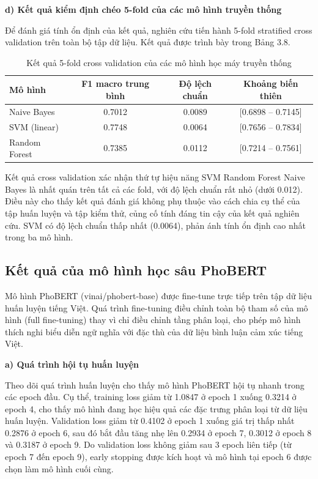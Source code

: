 \documentclass[14pt, a4paper]{report}
\begin{document}
\textbf{d) Kết quả kiểm định chéo 5-fold của các mô hình truyền thống}


Để đánh giá tính ổn định của kết quả, nghiên cứu tiến hành 5-fold stratified cross validation trên toàn bộ tập dữ liệu. Kết quả được trình bày trong Bảng 3.8.


\begin{table}[h]
\centering
\caption{Kết quả 5-fold cross validation của các mô hình học máy truyền thống}
\begin{tabular}{|l|c|c|c|}
\hline
\textbf{Mô hình} & \textbf{F1 macro trung bình} & \textbf{Độ lệch chuẩn} & \textbf{Khoảng biến thiên} \\
\hline
Naive Bayes & 0.7012 & 0.0089 & [0.6898 -- 0.7145] \\
\hline
SVM (linear) & 0.7748 & 0.0064 & [0.7656 -- 0.7834] \\
\hline
Random Forest & 0.7385 & 0.0112 & [0.7214 -- 0.7561] \\
\hline
\end{tabular}
\end{table}




Kết quả cross validation xác nhận thứ tự hiệu năng SVM \> Random Forest \> Naive Bayes là nhất quán trên tất cả các fold, với độ lệch chuẩn rất nhỏ (dưới 0.012). Điều này cho thấy kết quả đánh giá không phụ thuộc vào cách chia cụ thể của tập huấn luyện và tập kiểm thử, củng cố tính đáng tin cậy của kết quả nghiên cứu. SVM có độ lệch chuẩn thấp nhất (0.0064), phản ánh tính ổn định cao nhất trong ba mô hình.


\subsection{Kết quả của mô hình học sâu PhoBERT}


Mô hình PhoBERT (vinai/phobert-base) được fine-tune trực tiếp trên tập dữ liệu huấn luyện tiếng Việt. Quá trình fine-tuning điều chỉnh toàn bộ tham số của mô hình (full fine-tuning) thay vì chỉ điều chỉnh tầng phân loại, cho phép mô hình thích nghi biểu diễn ngữ nghĩa với đặc thù của dữ liệu bình luận cảm xúc tiếng Việt.


\textbf{a) Quá trình hội tụ huấn luyện}


Theo dõi quá trình huấn luyện cho thấy mô hình PhoBERT hội tụ nhanh trong các epoch đầu. Cụ thể, training loss giảm từ 1.0847 ở epoch 1 xuống 0.3214 ở epoch 4, cho thấy mô hình đang học hiệu quả các đặc trưng phân loại từ dữ liệu huấn luyện. Validation loss giảm từ 0.4102 ở epoch 1 xuống giá trị thấp nhất 0.2876 ở epoch 6, sau đó bắt đầu tăng nhẹ lên 0.2934 ở epoch 7, 0.3012 ở epoch 8 và 0.3187 ở epoch 9. Do validation loss không giảm sau 3 epoch liên tiếp (từ epoch 7 đến epoch 9), early stopping được kích hoạt và mô hình tại epoch 6 được chọn làm mô hình cuối cùng.
\end{document}
